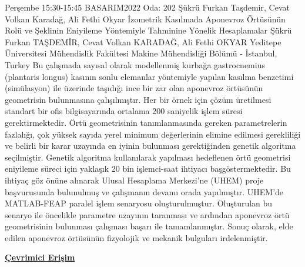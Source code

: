 
    \begin{abstract_basarim}
    {Perşembe 15:30-15:45}
    {BASARIM2022}
    {Oda: 202}
    {Şükrü Furkan Taşdemir, Cevat Volkan Karadağ, Ali Fethi Okyar}
    {İzometrik Kasılmada Aponevroz Örtüsünün Rolü ve Şeklinin Eniyileme Yöntemiyle Tahminine Yönelik Hesaplamalar}
    {%
    Şükrü Furkan TAŞDEMİR, Cevat Volkan KARADAĞ, Ali Fethi OKYAR}
    {%
    }
    {%
    Yeditepe Üniversitesi Mühendislik Fakültesi Makine Mühendisliği Bölümü - İstanbul, Turkey}
    Bu çalışmada sayısal olarak modellenmiş kurbağa gastrocnemius (plantaris longus) kasının sonlu elemanlar yöntemiyle yapılan kasılma benzetimi (simülasyon) ile üzerinde taşıdığı ince bir zar olan aponevroz örtüsünün geometrisin bulunmasına çalışılmıştır. Her bir örnek için çözüm üretilmesi standart bir ofis bilgisayarında ortalama 200 saniyelik işlem süresi gerektirmektedir. Örtü geometrisinin tanımlanmasında gereken parametrelerin fazlalığı, çok yüksek sayıda yerel minimum değerlerinin elimine edilmesi gerekliliği ve belirli bir karar uzayında en iyinin bulunması gerektiğinden genetik algoritma seçilmiştir. Genetik algoritma kullanılarak yapılması hedeflenen örtü geometrisi eniyileme süreci için yaklaşık 20 bin işlemci-saat ihtiyacı başgöstermektedir. Bu ihtiyaç göz önüne alınarak Ulusal Hesaplama Merkezi’ne (UHEM) proje başvurusunda bulunulmuş ve çalışmanın devamı orada yapılmıştır. UHEM’de MATLAB-FEAP paralel işlem senaryosu oluşturulmuştur. Oluşturulan bu senaryo ile öncelikle parametre uzayının taranması ve ardından aponevroz örtü geometrisinin bulunması çalışması başarı ile tamamlanmıştır. Sonuç olarak, elde edilen aponevroz örtüsünün fizyolojik ve mekanik bulguları irdelenmiştir. 
    
     \newline\newline\noindent \href{https://drive.google.com/file/d/1lTp_PZwjoVxHZTKNfq1FA31uPwH7xrcq/view?usp=drivesdk}{\bfseries Çevrimici Erişim}
    \end{abstract_basarim}
    